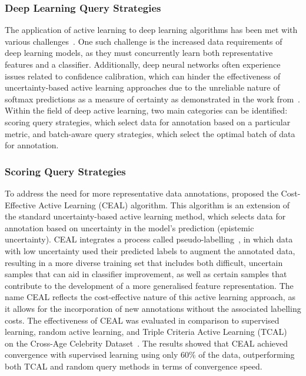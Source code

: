 \subsubsection{Deep Learning Query Strategies}
The application of active learning to deep learning algorithms has been met with various challenges~\citep{ren2021survey}. One such challenge is the increased data requirements of deep learning models, as they must concurrently learn both representative features and a classifier. Additionally, deep neural networks often experience issues related to confidence calibration, which can hinder the effectiveness of uncertainty-based active learning approaches due to the unreliable nature of softmax predictions as a measure of certainty as demonstrated in the work from~\cite{gal2016dropout}. Within the field of deep active learning, two main categories can be identified: scoring query strategies, which select data for annotation based on a particular metric, and batch-aware query strategies, which select the optimal batch of data for annotation.

\subsubsection{Scoring Query Strategies}
To address the need for more representative data annotations, \cite{wang2016cost} proposed the Cost-Effective Active Learning (CEAL) algorithm. This algorithm is an extension of the standard uncertainty-based active learning method, which selects data for annotation based on uncertainty in the model's prediction (epistemic uncertainty). CEAL integrates a process called pseudo-labelling~\citep{lee2013pseudo}, in which data with low uncertainty used their predicted labels to augment the annotated data, resulting in a more diverse training set that includes both difficult, uncertain samples that can aid in classifier improvement, as well as certain samples that contribute to the development of a more generalised feature representation. The name CEAL reflects the cost-effective nature of this active learning approach, as it allows for the incorporation of new annotations without the associated labelling costs. The effectiveness of CEAL was evaluated in comparison to supervised learning, random active learning, and Triple Criteria Active Learning (TCAL)~\citep{demir2014novel} on the Cross-Age Celebrity Dataset~\citep{chen2014cross}. The results showed that CEAL achieved convergence with supervised learning using only 60\% of the data, outperforming both TCAL and random query methods in terms of convergence speed.

